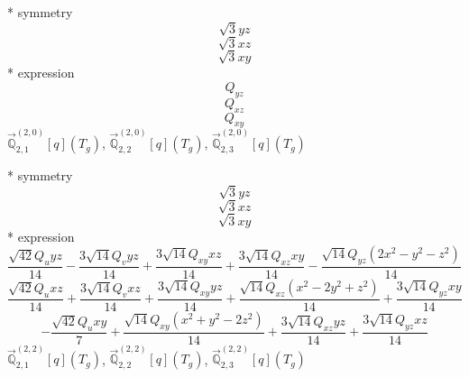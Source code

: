 \documentclass[fleqn,8pt]{jsarticle}
\begin{document}
\noindent\quad ** symmetry
\begin{dmath*}
\sqrt{3} y z
\end{dmath*}
\begin{dmath*}
\sqrt{3} x z
\end{dmath*}
\begin{dmath*}
\sqrt{3} x y
\end{dmath*}
\noindent\quad ** expression
\begin{dmath*}
Q_{yz}
\end{dmath*}
\begin{dmath*}
Q_{xz}
\end{dmath*}
\begin{dmath*}
Q_{xy}
\end{dmath*}
\noindent\quad $\vec{\mathbb{Q}}_{2,1}^{(2,0)}[q](T_{g})$, $\vec{\mathbb{Q}}_{2,2}^{(2,0)}[q](T_{g})$, $\vec{\mathbb{Q}}_{2,3}^{(2,0)}[q](T_{g})$

\noindent\quad ** symmetry
\begin{dmath*}
\sqrt{3} y z
\end{dmath*}
\begin{dmath*}
\sqrt{3} x z
\end{dmath*}
\begin{dmath*}
\sqrt{3} x y
\end{dmath*}
\noindent\quad ** expression
\begin{dmath*}
\frac{\sqrt{42} Q_{u} y z}{14} - \frac{3 \sqrt{14} Q_{v} y z}{14} + \frac{3 \sqrt{14} Q_{xy} x z}{14} + \frac{3 \sqrt{14} Q_{xz} x y}{14} - \frac{\sqrt{14} Q_{yz} \left(2 x^{2} - y^{2} - z^{2}\right)}{14}
\end{dmath*}
\begin{dmath*}
\frac{\sqrt{42} Q_{u} x z}{14} + \frac{3 \sqrt{14} Q_{v} x z}{14} + \frac{3 \sqrt{14} Q_{xy} y z}{14} + \frac{\sqrt{14} Q_{xz} \left(x^{2} - 2 y^{2} + z^{2}\right)}{14} + \frac{3 \sqrt{14} Q_{yz} x y}{14}
\end{dmath*}
\begin{dmath*}
- \frac{\sqrt{42} Q_{u} x y}{7} + \frac{\sqrt{14} Q_{xy} \left(x^{2} + y^{2} - 2 z^{2}\right)}{14} + \frac{3 \sqrt{14} Q_{xz} y z}{14} + \frac{3 \sqrt{14} Q_{yz} x z}{14}
\end{dmath*}
\noindent\quad $\vec{\mathbb{Q}}_{2,1}^{(2,2)}[q](T_{g})$, $\vec{\mathbb{Q}}_{2,2}^{(2,2)}[q](T_{g})$, $\vec{\mathbb{Q}}_{2,3}^{(2,2)}[q](T_{g})$
\end{document}
